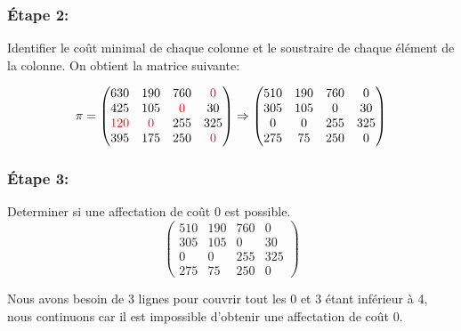 \documentclass{article}
\begin{document}
\subsubsection*{Étape 2:} Identifier le coût minimal de chaque colonne et le soustraire de chaque élément de la colonne. On obtient la matrice suivante:

$$\pi=\begin{pmatrix}
630 & 190 & 760 & \textcolor{red}{0}  \\
425 & 105 & \textcolor{red}{0} & 30\\
\textcolor{red}{120} & \textcolor{red}{0}  & 255 & 325\\
395 & 175 & 250 & \textcolor{red}{0} 
\end{pmatrix}
\Rightarrow
\begin{pmatrix}
510 & 190 & 760 & 0 \\
305 & 105 & 0 & 30\\
0 & 0 & 255 & 325\\
275 & 75 & 250 & 0
\end{pmatrix}$$

\subsubsection*{Étape 3:}Determiner si une affectation de coût 0 est possible.
$$\begin{pmatrix}
510 & 190 & 760 & 0 \\
305 & 105 & 0 & 30\\
0 & 0 & 255 & 325\\
275 & 75 & 250 & 0
\end{pmatrix}$$

Nous avons besoin de 3 lignes pour couvrir tout les 0  et 3 étant inférieur à 4, nous continuons car il est impossible d'obtenir une affectation de coût 0. 
\end{document}
